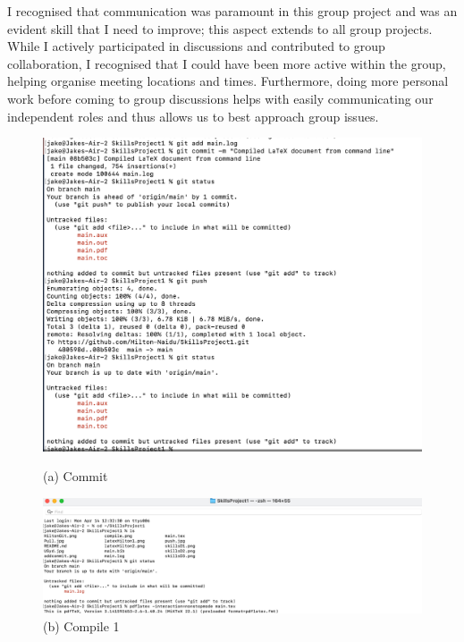 \documentclass[a4paper, 11pt]{report}
\begin{document}
I recognised that communication was paramount in this group project and was an evident skill that I need to improve; this aspect extends to all group projects. While I actively participated in discussions and contributed to group collaboration, I recognised that I could have been more active within the group, helping organise meeting locations and times. Furthermore, doing more personal work before coming to group discussions helps with easily communicating our independent roles and thus allows us to best approach group issues.

\newpage
\begin{figure}[htbp]
\centering
\begin{minipage}[t]{0.45\textwidth}
\centering
\includegraphics[width=\linewidth]{jakecommit.png}
\caption*{(a) Commit}
\end{minipage}
\hfill
\begin{minipage}[t]{0.45\textwidth}
\centering
\includegraphics[width=\linewidth]{jakecompile1.png}
\caption*{(b) Compile 1}
\end{minipage}

\vspace{0.5cm}


\end{figure}
\end{document}
